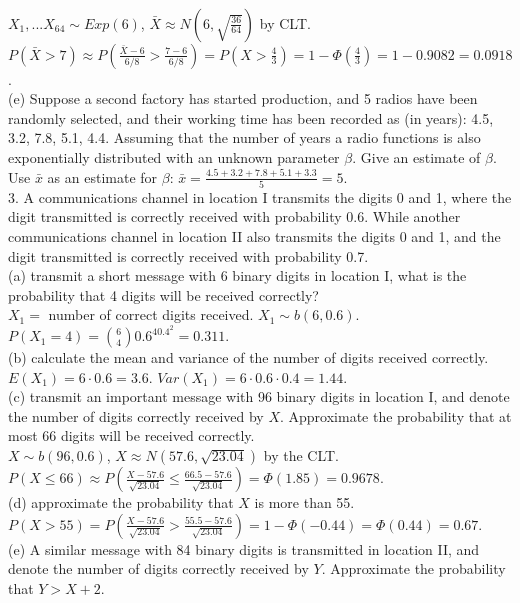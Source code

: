 \documentclass[9pt]{article}
\begin{document}
        \\$X_{1},...X_{64}\sim Exp(6)$, $\bar{X}\approx N(6, \sqrt{\frac{36}{64}})$ by CLT. $P(\bar{X}>7)\approx P(\frac{\bar{X}-6}{6/8}> \frac{7-6}{6/8}) = P(X>\frac{4}{3}) = 1-\Phi(\frac{4}{3})=1-0.9082=0.0918$.
        \\(e) Suppose a second factory has started production, and 5 radios have been randomly selected, and their working time has been recorded as (in years): 4.5, 3.2, 7.8, 5.1, 4.4. Assuming that the number of years a radio functions is also exponentially distributed with
        an unknown parameter $\beta$. Give an estimate of $\beta$. \\Use $\bar{x}$ as an estimate for $\beta$: $\bar{x}=\frac{4.5+3.2+7.8+5.1+3.3}{5} = 5$.\\
        3. A communications channel in location I transmits the digits 0 and 1, where the digit transmitted is
        correctly received with probability 0.6. While another communications channel in location II also
        transmits the digits 0 and 1, and the digit transmitted is correctly received with probability 0.7.
        \\(a) transmit a short message with 6 binary digits in location I, what is the probability that 4 digits will be received correctly?
        \\$X_1=$ number of correct digits received. $X_1\sim b(6, 0.6)$. $P(X_1=4)=\binom{6}{4}0.6^40.4^2=0.311$.
        \\(b) calculate the mean and variance of the number of digits received correctly. \\$E(X_1)=6\cdot 0.6 = 3.6$. $Var(X_1)=6\cdot 0.6\cdot 0.4 = 1.44$.
        \\(c) transmit an important message with 96 binary digits in location I, and denote the number of digits correctly received by $X$. Approximate the probability that at most 66 digits will be received correctly.
        \\$X\sim b(96, 0.6)$, $X\approx N(57.6, \sqrt{23.04})$ by the CLT. $P(X\leq 66) \approx P(\frac{X-57.6}{\sqrt{23.04}}\leq \frac{66.5-57.6}{\sqrt{23.04}}) = \Phi(1.85)=0.9678$.
        \\(d) approximate the probability that $X$ is more than 55. \\$P(X>55)= P(\frac{X-57.6}{\sqrt{23.04}}>\frac{55.5-57.6}{\sqrt{23.04}}) = 1 - \Phi(-0.44) = \Phi(0.44) = 0.67$.
        \\(e) A similar message with 84 binary digits is transmitted in location II, and denote the number of digits correctly received by $Y$. Approximate the probability that $Y > X + 2$.
\end{document}

